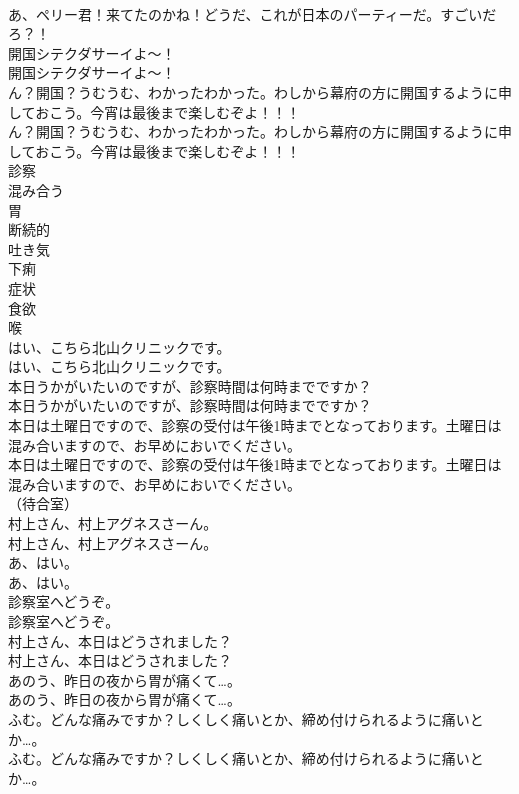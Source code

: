 \documentclass[8pt]{extreport}
\begin{document}
\begin{CJK}{UTF8}{min}
\\	あ、ペリー君！来てたのかね！どうだ、これが日本のパーティーだ。すごいだろ？！	
\\	開国シテクダサーイよ～！	
\\	開国シテクダサーイよ～！ 
\\	ん？開国？うむうむ、わかったわかった。わしから幕府の方に開国するように申しておこう。今宵は最後まで楽しむぞよ！！！	
\\	ん？開国？うむうむ、わかったわかった。わしから幕府の方に開国するように申しておこう。今宵は最後まで楽しむぞよ！！！ 
\\	診察
\\	混み合う
\\	胃
\\	断続的
\\	吐き気
\\	下痢
\\	症状
\\	食欲
\\	喉
\\	はい、こちら北山クリニックです。	
\\	はい、こちら北山クリニックです。 
\\	本日うかがいたいのですが、診察時間は何時までですか？	
\\	本日うかがいたいのですが、診察時間は何時までですか？ 
\\	本日は土曜日ですので、診察の受付は午後1時までとなっております。土曜日は混み合いますので、お早めにおいでください。	
\\	本日は土曜日ですので、診察の受付は午後1時までとなっております。土曜日は混み合いますので、お早めにおいでください。 
\\	（待合室）	
\\	村上さん、村上アグネスさーん。	
\\	村上さん、村上アグネスさーん。 
\\	あ、はい。	
\\	あ、はい。 
\\	診察室へどうぞ。	
\\	診察室へどうぞ。 
\\	村上さん、本日はどうされました？	
\\	村上さん、本日はどうされました？ 
\\	あのう、昨日の夜から胃が痛くて…。	
\\	あのう、昨日の夜から胃が痛くて…。 
\\	ふむ。どんな痛みですか？しくしく痛いとか、締め付けられるように痛いとか…。	
\\	ふむ。どんな痛みですか？しくしく痛いとか、締め付けられるように痛いとか…。 

\end{CJK}
\end{document}
